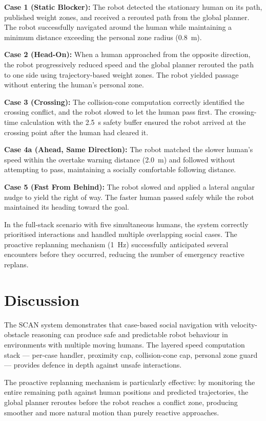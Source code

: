 \documentclass[a4paper]{article}
\begin{document}
\textbf{Case 1 (Static Blocker):} The robot detected the stationary human on its path, published weight zones, and received a rerouted path from the global planner. The robot successfully navigated around the human while maintaining a minimum distance exceeding the personal zone radius (0.8~m).

\textbf{Case 2 (Head-On):} When a human approached from the opposite direction, the robot progressively reduced speed and the global planner rerouted the path to one side using trajectory-based weight zones. The robot yielded passage without entering the human's personal zone.

\textbf{Case 3 (Crossing):} The collision-cone computation correctly identified the crossing conflict, and the robot slowed to let the human pass first. The crossing-time calculation with the 2.5~s safety buffer ensured the robot arrived at the crossing point after the human had cleared it.

\textbf{Case 4a (Ahead, Same Direction):} The robot matched the slower human's speed within the overtake warning distance (2.0~m) and followed without attempting to pass, maintaining a socially comfortable following distance.

\textbf{Case 5 (Fast From Behind):} The robot slowed and applied a lateral angular nudge to yield the right of way. The faster human passed safely while the robot maintained its heading toward the goal.

In the full-stack scenario with five simultaneous humans, the system correctly prioritised interactions and handled multiple overlapping social cases. The proactive replanning mechanism (1~Hz) successfully anticipated several encounters before they occurred, reducing the number of emergency reactive replans.


\section{Discussion}

The SCAN system demonstrates that case-based social navigation with velocity-obstacle reasoning can produce safe and predictable robot behaviour in environments with multiple moving humans. The layered speed computation stack --- per-case handler, proximity cap, collision-cone cap, personal zone guard --- provides defence in depth against unsafe interactions.

The proactive replanning mechanism is particularly effective: by monitoring the entire remaining path against human positions and predicted trajectories, the global planner reroutes before the robot reaches a conflict zone, producing smoother and more natural motion than purely reactive approaches.
\end{document}
